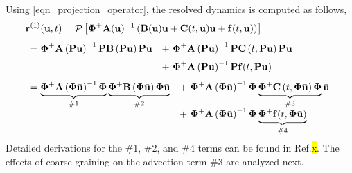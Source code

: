 Using \cref{eqn_projection_operator}, the resolved dynamics is computed as follows,
\begin{subequations}
    \begin{align}
        &\vr^{(1)}(\vu,t) = 
        \cP\left[\vPhiplus\vA(\vu)^{-1}\left(\vB(\vu)\vu + \vC(t,\vu)\vu + \vf(t,\vu)\right)\right]\\[4pt]
        &\begin{array}{rl}
            =\vPhiplus\vA\left(\vP\vu\right)^{-1}\vP\vB\left(\vP\vu\right)\vP\vu
            &+~\vPhiplus\vA\left(\vP\vu\right)^{-1}\vP\vC\left(t,\vP\vu\right)\vP\vu \\[6pt]
            &+~\vPhiplus\vA\left(\vP\vu\right)^{-1}\vP\vf(t,\vP\vu)
        \end{array}\\[4pt]
        &\begin{array}{rl}
            =\underbrace{\vPhiplus\vA\left(\vPhi\bvu\right)^{-1}\vPhi}_{\text{\#1}}
            \underbrace{\vPhiplus\vB\left(\vPhi\bvu\right)\vPhi\bvu}_{\text{\#2}}
            &+~\vPhiplus\vA\left(\vPhi\bvu\right)^{-1}\vPhi
            \underbrace{\vPhiplus\vC\left(t,\vPhi\bvu\right)\vPhi}_{\text{\#3}}\bvu \\[6pt]
            &+~\vPhiplus\vA\left(\vPhi\bvu\right)^{-1}\vPhi
            \underbrace{\vPhiplus\vf(t,\vPhi\bvu)}_{\text{\#4}}
        \end{array}
    \end{align}
\end{subequations}
Detailed derivations for the \#1, \#2, and \#4 terms can be found in Ref.\hl{x}. The effects of coarse-graining on the advection term \#3 are analyzed next.

